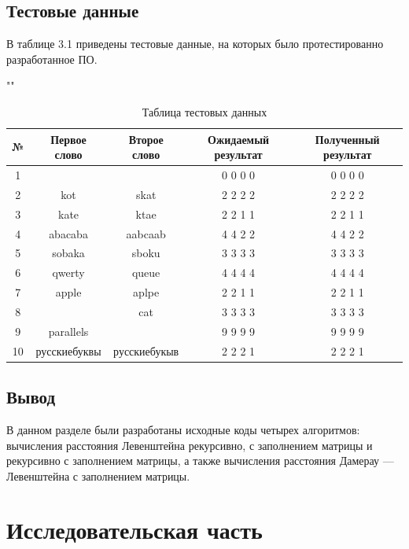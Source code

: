 \documentclass[12pt]{report}
\begin{document}
\section{Тестовые данные}

В таблице 3.1 приведены тестовые данные, на которых было протестированно разработанное ПО.

\begin{table}[h]
	\begin{center}
		\caption{Таблица тестовых данных}
		""\newline
		\begin{tabular}{|c c c c c|} 
			\hline
			№ & Первое слово & Второе слово & Ожидаемый результат & Полученный результат \\ [0.8ex] 
			\hline
			1 &  &  & 0 0 0 0 & 0 0 0 0\\
			\hline
			2 & kot & skat & 2 2 2 2 & 2 2 2 2\\
			\hline
			3 & kate & ktae & 2 2 1 1 & 2 2 1 1\\
			\hline
			4 & abacaba & aabcaab & 4 4 2 2 & 4 4 2 2\\
			\hline
			5 & sobaka & sboku & 3 3 3 3 & 3 3 3 3\\
			\hline
			6 & qwerty & queue & 4 4 4 4 & 4 4 4 4\\
			\hline
			7 & apple & aplpe & 2 2 1 1  & 2 2 1 1\\
			\hline
			8 &  & cat & 3 3 3 3 & 3 3 3 3\\
			\hline
			9 & parallels &  & 9 9 9 9 & 9 9 9 9\\
			\hline
			10 & русскиебуквы & русскиебукыв & 2 2 2 1 & 2 2 2 1\\
			\hline
		\end{tabular}
	\end{center}
\end{table}

\section{Вывод}
В данном разделе были разработаны исходные коды четырех алгоритмов: вычисления расстояния Левенштейна рекурсивно, с заполнением матрицы и рекурсивно с заполнением матрицы, а также вычисления расстояния Дамерау — Левенштейна с заполнением матрицы.

\chapter{Исследовательская часть}
\end{document}

